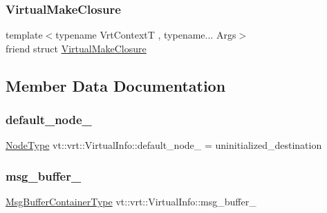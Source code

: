 \subsubsection{\texorpdfstring{Virtual\+Make\+Closure}{VirtualMakeClosure}}
{\footnotesize\ttfamily template$<$typename Vrt\+ContextT , typename... Args$>$ \\
friend struct \hyperlink{structvt_1_1vrt_1_1_virtual_make_closure}{Virtual\+Make\+Closure}\hspace{0.3cm}{\ttfamily [friend]}}



\subsection{Member Data Documentation}
\mbox{\label{structvt_1_1vrt_1_1_virtual_info_aab9e25f18e560b403b3f62ebea9f8233}} 
\subsubsection{\texorpdfstring{default\+\_\+node\+\_\+}{default\_node\_}}
{\footnotesize\ttfamily \hyperlink{namespacevt_a866da9d0efc19c0a1ce79e9e492f47e2}{Node\+Type} vt\+::vrt\+::\+Virtual\+Info\+::default\+\_\+node\+\_\+ = uninitialized\+\_\+destination\hspace{0.3cm}{\ttfamily [private]}}

\mbox{\label{structvt_1_1vrt_1_1_virtual_info_ad8c0bf11f1dceb5891d08e3aaf6a2d95}} 
\subsubsection{\texorpdfstring{msg\+\_\+buffer\+\_\+}{msg\_buffer\_}}
{\footnotesize\ttfamily \hyperlink{structvt_1_1vrt_1_1_virtual_info_a58e94aae79e1e8f0bb4c2bf6c7ba608e}{Msg\+Buffer\+Container\+Type} vt\+::vrt\+::\+Virtual\+Info\+::msg\+\_\+buffer\+\_\+\hspace{0.3cm}{\ttfamily [private]}}


